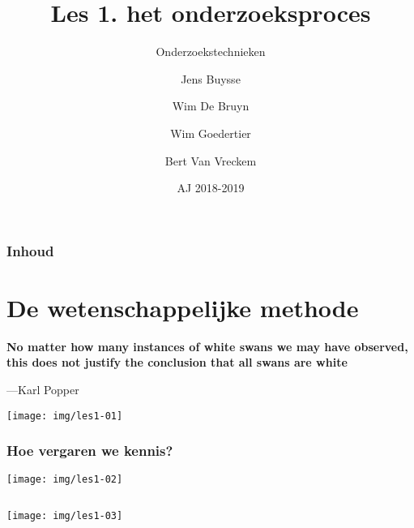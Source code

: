 \documentclass[aspectratio=169]{beamer}
\title[OZT: onderzoeksproces]{Les 1. het onderzoeksproces}
\subtitle{Onderzoekstechnieken}
\author{Jens Buysse \and Wim {De Bruyn} \and Wim Goedertier \and Bert {Van Vreckem}}
\date{AJ 2018-2019}
\begin{document}

\begin{frame}
  \maketitle
\end{frame}


\begin{frame}
  \frametitle{Inhoud}

  \tableofcontents
\end{frame}

\section{De wetenschappelijke methode}

\begin{frame}[plain]
  \bfseries\Large
  No matter how many instances of white swans we may have observed, this does not justify the conclusion that all swans are white
  
  \bigskip
  
  ---Karl Popper
\end{frame}

\begin{frame}[plain]
  \centering
  \texttt{[image: img/les1-01]}
\end{frame}

\begin{frame}
  \frametitle{Hoe vergaren we kennis?}

  \centering
  \texttt{[image: img/les1-02]}
\end{frame}

\begin{frame}[plain,c]
  \begin{columns}
    \column{\dimexpr\paperwidth}
    \texttt{[image: img/les1-03]}
  \end{columns}
\end{frame}
\end{document}
